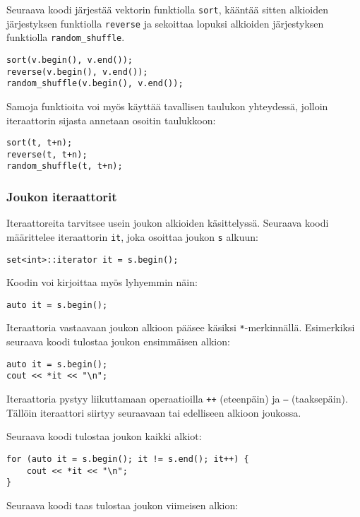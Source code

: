 Seuraava koodi järjestää vektorin funktiolla \texttt{sort},
kääntää sitten alkioiden järjestyksen funktiolla \texttt{reverse}
ja sekoittaa lopuksi alkioiden järjestyksen funktiolla \texttt{random\_shuffle}.


\begin{lstlisting}
sort(v.begin(), v.end());
reverse(v.begin(), v.end());
random_shuffle(v.begin(), v.end());
\end{lstlisting}

Samoja funktioita voi myös käyttää tavallisen taulukon
yhteydessä, jolloin iteraattorin sijasta annetaan
osoitin taulukkoon:

\begin{lstlisting}
sort(t, t+n);
reverse(t, t+n);
random_shuffle(t, t+n);
\end{lstlisting}

\subsubsection{Joukon iteraattorit}

Iteraattoreita tarvitsee usein joukon
alkioiden käsittelyssä.
Seuraava koodi määrittelee iteraattorin
\texttt{it}, joka osoittaa joukon \texttt{s} alkuun:

\begin{lstlisting}
set<int>::iterator it = s.begin();
\end{lstlisting}

Koodin voi kirjoittaa myös lyhyemmin näin:

\begin{lstlisting}
auto it = s.begin();
\end{lstlisting}
Iteraattoria vastaavaan joukon alkioon
pääsee käsiksi \texttt{*}-merkinnällä.
Esimerkiksi seuraava koodi tulostaa
joukon ensimmäisen alkion:

\begin{lstlisting}
auto it = s.begin();
cout << *it << "\n";
\end{lstlisting}
Iteraattoria pystyy liikuttamaan
operaatioilla \texttt{++} (eteenpäin)
ja \texttt{---} (taaksepäin).
Tällöin iteraattori siirtyy seuraavaan
tai edelliseen alkioon joukossa.

Seuraava koodi tulostaa joukon kaikki alkiot:

\begin{lstlisting}
for (auto it = s.begin(); it != s.end(); it++) {
    cout << *it << "\n";
}
\end{lstlisting}
Seuraava koodi taas tulostaa joukon
viimeisen alkion:


